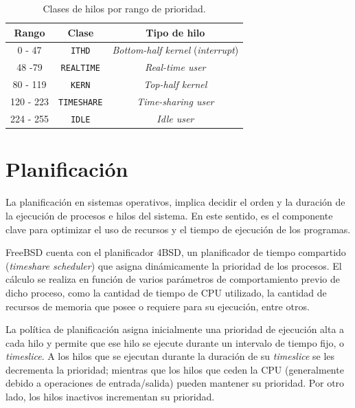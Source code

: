 \begin{table}[H]
    \centering
    \begin{tabular}{|c|c|c|}
        \hline
        \textbf{Rango} & \textbf{Clase} & \textbf{Tipo de hilo}          \\
        \hline
        0 - 47         & \texttt{ITHD}           & \textit{Bottom-half kernel} (\textit{interrupt}) \\
        \hline
        48 -79         & \texttt{REALTIME}       & \textit{Real-time user}                 \\
        \hline
        80 - 119       & \texttt{KERN}           & \textit{Top-half kernel}                \\
        \hline
        120 - 223      & \texttt{TIMESHARE}      & \textit{Time-sharing user}              \\
        \hline
        224 - 255      & \texttt{IDLE}           & \textit{Idle user}                      \\
        \hline
    \end{tabular}
    \caption{Clases de hilos por rango de prioridad.}
    \label{tabla:prio-hilos}
\end{table}


\section{Planificación}

La planificación en sistemas operativos, implica decidir el orden y la duración de la ejecución de procesos e hilos del sistema. En este sentido, es el componente clave para optimizar el uso de recursos y el tiempo de ejecución de los programas.\par

FreeBSD cuenta con el planificador 4BSD, un planificador de tiempo compartido (\textit{timeshare scheduler}) que asigna dinámicamente la prioridad de los procesos. El cálculo se realiza en función de varios parámetros de comportamiento previo de dicho proceso, como la cantidad de tiempo de CPU utilizado, la cantidad de recursos de memoria que posee o requiere para su ejecución, entre otros.\par

La política de planificación asigna inicialmente una prioridad de ejecución alta a cada hilo y permite que ese hilo se ejecute durante un intervalo de tiempo fijo, o \textit{timeslice}. A los hilos que se ejecutan durante la duración de su \textit{timeslice} se les decrementa la prioridad; mientras que los hilos que ceden la CPU (generalmente debido a operaciones de entrada/salida) pueden mantener su prioridad. Por otro lado, los hilos inactivos incrementan su prioridad.\par


